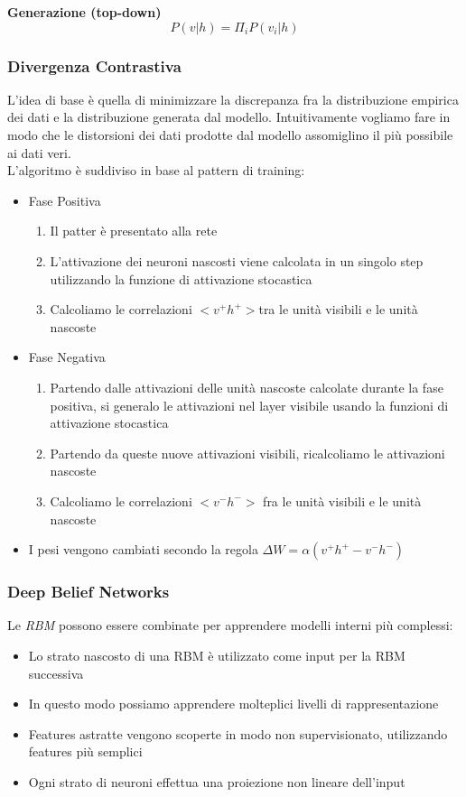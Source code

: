 \documentclass[12pt, a4paper]{article}
\begin{document}
\textbf{Generazione (top-down)}
\[P(v|h) = \Pi_i P(v_i|h)\]

\subsubsection{Divergenza Contrastiva}
L'idea di base è quella di minimizzare la discrepanza fra la distribuzione empirica dei dati e la distribuzione generata dal modello. Intuitivamente vogliamo fare in modo che le distorsioni dei dati prodotte dal modello assomiglino il più possibile ai dati veri.\\
L'algoritmo è suddiviso in base al pattern di training:
\begin{itemize}
    \item Fase Positiva
    \begin{enumerate}
        \item Il patter è presentato alla rete
        \item L'attivazione dei neuroni nascosti viene calcolata in un singolo step utilizzando la funzione di attivazione stocastica
        \item Calcoliamo le correlazioni \(<v^+h^+>\)tra le unità visibili e le unità nascoste
    \end{enumerate}

    \item Fase Negativa
    \begin{enumerate}
        \item Partendo dalle attivazioni delle unità nascoste calcolate durante la fase positiva, si generalo le attivazioni nel layer visibile usando la funzioni di attivazione stocastica
        \item Partendo da queste nuove attivazioni visibili, ricalcoliamo le attivazioni nascoste
        \item Calcoliamo le correlazioni \(<v^-h^->\) fra le unità visibili e le unità nascoste
    \end{enumerate}

    \item I pesi vengono cambiati secondo la regola \(\Delta W = \alpha (v^+h^+ - v^-h^-)\)

\end{itemize}

\subsubsection{Deep Belief Networks}
Le \textit{RBM} possono essere combinate per apprendere modelli interni più complessi:
\begin{itemize}
    \item Lo strato nascosto di una RBM è utilizzato come input per la RBM successiva
    \item In questo modo possiamo apprendere molteplici livelli di rappresentazione
    \item Features astratte vengono scoperte in modo non supervisionato, utilizzando features più semplici
    \item Ogni strato di neuroni effettua una proiezione non lineare dell'input
\end{itemize}
\end{document}
